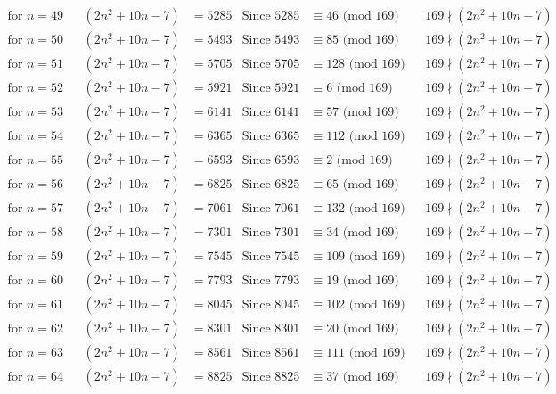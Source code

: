 \documentclass[12pt]{article}
\begin{document}
\begin{align*}
\text{for $n = 49 $}&& (2n^2+10n-7) &= 5285 & \text{Since } 5285  &\equiv  46 \text{ (mod $169$)}&& 169 \nmid (2n^2+10n-7)\\
\text{for $n = 50 $}&& (2n^2+10n-7) &= 5493 & \text{Since } 5493  &\equiv  85 \text{ (mod $169$)}&& 169 \nmid (2n^2+10n-7)\\
\text{for $n = 51 $}&& (2n^2+10n-7) &= 5705 & \text{Since } 5705  &\equiv  128 \text{ (mod $169$)}&& 169 \nmid (2n^2+10n-7)\\
\text{for $n = 52 $}&& (2n^2+10n-7) &= 5921 & \text{Since } 5921  &\equiv  6 \text{ (mod $169$)}&& 169 \nmid (2n^2+10n-7)\\
\text{for $n = 53 $}&& (2n^2+10n-7) &= 6141 & \text{Since } 6141  &\equiv  57 \text{ (mod $169$)}&& 169 \nmid (2n^2+10n-7)\\
\text{for $n = 54 $}&& (2n^2+10n-7) &= 6365 & \text{Since } 6365  &\equiv  112 \text{ (mod $169$)}&& 169 \nmid (2n^2+10n-7)\\
\text{for $n = 55 $}&& (2n^2+10n-7) &= 6593 & \text{Since } 6593  &\equiv  2 \text{ (mod $169$)}&& 169 \nmid (2n^2+10n-7)\\
\text{for $n = 56 $}&& (2n^2+10n-7) &= 6825 & \text{Since } 6825  &\equiv  65 \text{ (mod $169$)}&& 169 \nmid (2n^2+10n-7)\\
\text{for $n = 57 $}&& (2n^2+10n-7) &= 7061 & \text{Since } 7061  &\equiv  132 \text{ (mod $169$)}&& 169 \nmid (2n^2+10n-7)\\
\text{for $n = 58 $}&& (2n^2+10n-7) &= 7301 & \text{Since } 7301  &\equiv  34 \text{ (mod $169$)}&& 169 \nmid (2n^2+10n-7)\\
\text{for $n = 59 $}&& (2n^2+10n-7) &= 7545 & \text{Since } 7545  &\equiv  109 \text{ (mod $169$)}&& 169 \nmid (2n^2+10n-7)\\
\text{for $n = 60 $}&& (2n^2+10n-7) &= 7793 & \text{Since } 7793  &\equiv  19 \text{ (mod $169$)}&& 169 \nmid (2n^2+10n-7)\\
\text{for $n = 61 $}&& (2n^2+10n-7) &= 8045 & \text{Since } 8045  &\equiv  102 \text{ (mod $169$)}&& 169 \nmid (2n^2+10n-7)\\
\text{for $n = 62 $}&& (2n^2+10n-7) &= 8301 & \text{Since } 8301  &\equiv  20 \text{ (mod $169$)}&& 169 \nmid (2n^2+10n-7)\\
\text{for $n = 63 $}&& (2n^2+10n-7) &= 8561 & \text{Since } 8561  &\equiv  111 \text{ (mod $169$)}&& 169 \nmid (2n^2+10n-7)\\
\text{for $n = 64 $}&& (2n^2+10n-7) &= 8825 & \text{Since } 8825  &\equiv  37 \text{ (mod $169$)}&& 169 \nmid (2n^2+10n-7)\\

\end{align*}
\end{document}
